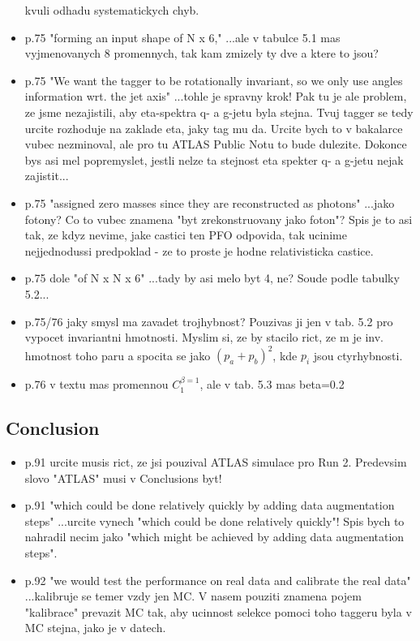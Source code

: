 \begin{itemize}
kvuli odhadu systematickych chyb.
\item p.75 "forming an input shape of N x 6," ...ale v tabulce 5.1 mas 
vyjmenovanych 8 promennych, tak kam zmizely ty dve a ktere to jsou?
\item p.75 "We want the tagger to be rotationally invariant, so we only use 
angles information wrt. the jet axis" ...tohle je spravny krok! Pak tu 
je ale problem, ze jsme nezajistili, aby eta-spektra q- a g-jetu byla 
stejna. Tvuj tagger se tedy urcite rozhoduje na zaklade eta, jaky tag mu 
da. Urcite bych to v bakalarce vubec nezminoval, ale pro tu ATLAS Public 
Notu to bude dulezite. Dokonce bys asi mel popremyslet, jestli nelze ta 
stejnost eta spekter q- a g-jetu nejak zajistit...
\item p.75 "assigned zero masses since they are reconstructed as photons" 
...jako fotony? Co to vubec znamena "byt zrekonstruovany jako foton"? 
Spis je to asi tak, ze kdyz nevime, jake castici ten PFO odpovida, tak 
ucinime nejjednodussi predpoklad - ze to proste je hodne relativisticka 
castice.
\item p.75 dole "of N x N x 6" ...tady by asi melo byt 4, ne? Soude podle 
tabulky 5.2...
\item p.75/76 jaky smysl ma zavadet trojhybnost? Pouzivas ji jen v tab. 5.2 
pro vypocet invariantni hmotnosti. Myslim si, ze by stacilo rict, ze m 
je inv. hmotnost toho paru a spocita se jako $(p_a + p_b)^2$, kde $p_i$ jsou 
ctyrhybnosti.
\item p.76 v textu mas promennou $C_1^{\beta=1}$, ale v tab. 5.3 mas beta=0.2
\end{itemize}

\subsection{Conclusion}
\begin{itemize} 
\item p.91 urcite musis rict, ze jsi pouzival ATLAS simulace pro Run 2. 
Predevsim slovo "ATLAS" musi v Conclusions byt! 
\item p.91 "which could be done relatively quickly by adding data 
augmentation steps" ...urcite vynech "which could be done relatively 
quickly"! Spis bych to nahradil necim jako "which might be achieved by 
adding data augmentation steps".
\item p.92 "we would test the performance on real data and calibrate the 
real data" ...kalibruje se temer vzdy jen MC. V nasem pouziti znamena 
pojem "kalibrace" prevazit MC tak, aby ucinnost selekce pomoci toho 
taggeru byla v MC stejna, jako je v datech.
\end{itemize}